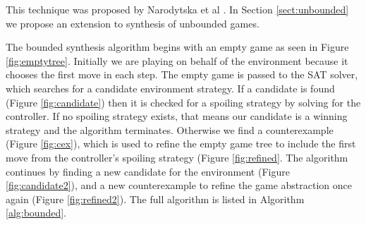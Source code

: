 \documentclass{llncs}
\begin{document}
This technique was proposed by Narodytska et al \cite{narodytska2014}. In
Section \ref{sect:unbounded} we propose an extension to synthesis of unbounded
games.

The bounded synthesis algorithm begins with an empty game as seen in Figure
\ref{fig:emptytree}.  Initially we are playing on behalf of the environment
because it chooses the first move in each step.  The empty game is passed to
the SAT solver, which searches for a candidate environment strategy.  If a
candidate is found (Figure \ref{fig:candidate}) then it is checked for a
spoiling strategy by solving for the controller.  If no spoiling strategy
exists, that means our candidate is a winning strategy and the algorithm
terminates.  Otherwise we find a counterexample (Figure \ref{fig:cex}), which
is used to refine the empty game tree to include the first move from the
controller's spoiling strategy (Figure \ref{fig:refined}.  The algorithm
continues by finding a new candidate for the environment (Figure
\ref{fig:candidate2}), and a new counterexample to refine the game abstraction
once again (Figure \ref{fig:refined2}). The full algorithm is listed in
Algorithm \ref{alg:bounded}.
\end{document}
